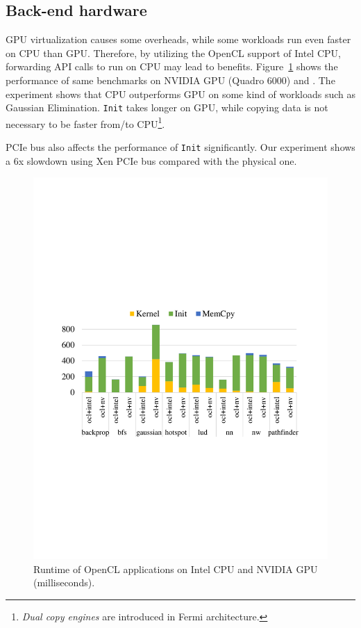 \subsection{Back-end hardware}
GPU virtualization causes some overheads, while some workloads run even faster on CPU than GPU.
Therefore, by utilizing the OpenCL support of Intel CPU, forwarding API calls to run on CPU
may lead to benefits. Figure~\ref{fig_hardware} shows the performance of same benchmarks on
NVIDIA GPU (Quadro 6000) and . The experiment shows that CPU outperforms
GPU on some kind of workloads such as Gaussian Elimination. \texttt{Init} takes longer on GPU,
while copying data is not necessary to be faster from/to CPU\footnote{\textit{Dual copy engines} are
introduced in Fermi architecture.}.

PCIe bus also affects the performance of \texttt{Init} significantly. Our experiment shows
a 6x slowdown using Xen PCIe bus compared with the physical one.

\begin{figure}[!th]
	\centering
	\includegraphics[width=\linewidth,trim={2cm 9cm 2cm 8cm},clip]{data/basic/hardware.pdf}
	\caption{{\footnotesize Runtime of OpenCL applications on Intel CPU and NVIDIA GPU (milliseconds). }}
	\label{fig_hardware} \end{figure}

